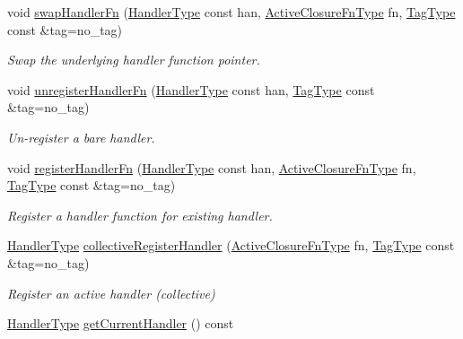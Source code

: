 \begin{DoxyCompactItemize}
void \hyperlink{structvt_1_1messaging_1_1_active_messenger_aa5544a4d13407ec3432e2eb48a60005d}{swap\+Handler\+Fn} (\hyperlink{namespacevt_af64846b57dfcaf104da3ef6967917573}{Handler\+Type} const han, \hyperlink{namespacevt_a2a06c34cafcd511828f16cbf1476b924}{Active\+Closure\+Fn\+Type} fn, \hyperlink{namespacevt_a84ab281dae04a52a4b243d6bf62d0e52}{Tag\+Type} const \&tag=no\+\_\+tag)
\begin{DoxyCompactList}\small\item\em Swap the underlying handler function pointer. \end{DoxyCompactList}\item 
void \hyperlink{structvt_1_1messaging_1_1_active_messenger_a1f3defb40c1a5700c3d6cafae09ef7c6}{unregister\+Handler\+Fn} (\hyperlink{namespacevt_af64846b57dfcaf104da3ef6967917573}{Handler\+Type} const han, \hyperlink{namespacevt_a84ab281dae04a52a4b243d6bf62d0e52}{Tag\+Type} const \&tag=no\+\_\+tag)
\begin{DoxyCompactList}\small\item\em Un-\/register a bare handler. \end{DoxyCompactList}\item 
void \hyperlink{structvt_1_1messaging_1_1_active_messenger_aec741a8dbff9585e378f32d6ef2a2163}{register\+Handler\+Fn} (\hyperlink{namespacevt_af64846b57dfcaf104da3ef6967917573}{Handler\+Type} const han, \hyperlink{namespacevt_a2a06c34cafcd511828f16cbf1476b924}{Active\+Closure\+Fn\+Type} fn, \hyperlink{namespacevt_a84ab281dae04a52a4b243d6bf62d0e52}{Tag\+Type} const \&tag=no\+\_\+tag)
\begin{DoxyCompactList}\small\item\em Register a handler function for existing handler. \end{DoxyCompactList}\item 
\hyperlink{namespacevt_af64846b57dfcaf104da3ef6967917573}{Handler\+Type} \hyperlink{structvt_1_1messaging_1_1_active_messenger_a7e693e4b292e45fc1ed0dc8c9e2c03ec}{collective\+Register\+Handler} (\hyperlink{namespacevt_a2a06c34cafcd511828f16cbf1476b924}{Active\+Closure\+Fn\+Type} fn, \hyperlink{namespacevt_a84ab281dae04a52a4b243d6bf62d0e52}{Tag\+Type} const \&tag=no\+\_\+tag)
\begin{DoxyCompactList}\small\item\em Register an active handler (collective) \end{DoxyCompactList}\item 
\hyperlink{namespacevt_af64846b57dfcaf104da3ef6967917573}{Handler\+Type} \hyperlink{structvt_1_1messaging_1_1_active_messenger_a80753933950fa9619a5b675e5db291ad}{get\+Current\+Handler} () const

\end{DoxyCompactItemize}
